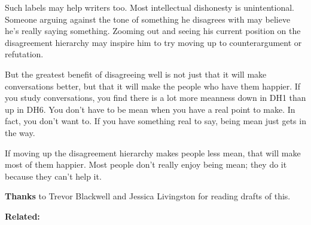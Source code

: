 Such labels may help writers too. Most intellectual dishonesty is
unintentional. Someone arguing against the tone of something he
disagrees with may believe he's really saying something. Zooming out and
seeing his current position on the disagreement hierarchy may inspire
him to try moving up to counterargument or refutation.

But the greatest benefit of disagreeing well is not just that it will
make conversations better, but that it will make the people who have
them happier. If you study conversations, you find there is a lot more
meanness down in DH1 than up in DH6. You don't have to be mean when you
have a real point to make. In fact, you don't want to. If you have
something real to say, being mean just gets in the way.

If moving up the disagreement hierarchy makes people less mean, that
will make most of them happier. Most people don't really enjoy being
mean; they do it because they can't help it.

\textbf{Thanks} to Trevor Blackwell and Jessica Livingston for reading
drafts of this.

\textbf{Related:}